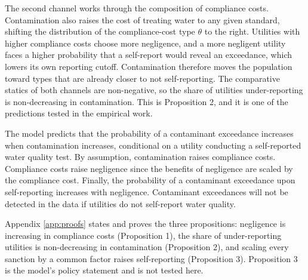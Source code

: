 \documentclass[12pt]{article}
\begin{document}
	The second channel works through the composition of compliance costs. Contamination also raises the cost of treating water to any given standard, shifting the distribution of the compliance-cost type $\theta$ to the right. Utilities with higher compliance costs choose more negligence, and a more negligent utility faces a higher probability that a self-report would reveal an exceedance, which lowers its own reporting cutoff. Contamination therefore moves the population toward types that are already closer to not self-reporting. The comparative statics of both channels are non-negative, so the share of utilities under-reporting is non-decreasing in contamination. This is Proposition 2, and it is one of the predictions tested in the empirical work.

    The model predicts that the probability of a contaminant exceedance increases when contamination increases, conditional on a utility conducting a self-reported water quality test. By assumption, contamination raises compliance costs. Compliance costs raise negligence since the benefits of negligence are scaled by the compliance cost. Finally, the probability of a contaminant exceedance upon self-reporting increases with negligence. Contaminant exceedances will not be detected in the data if utilities do not self-report water quality.


	Appendix \ref{app:proofs} states and proves the three propositions: negligence is increasing in compliance costs (Proposition 1), the share of under-reporting utilities is non-decreasing in contamination (Proposition 2), and scaling every sanction by a common factor raises self-reporting (Proposition 3). Proposition 3 is the model's policy statement and is not tested here.
\end{document}
